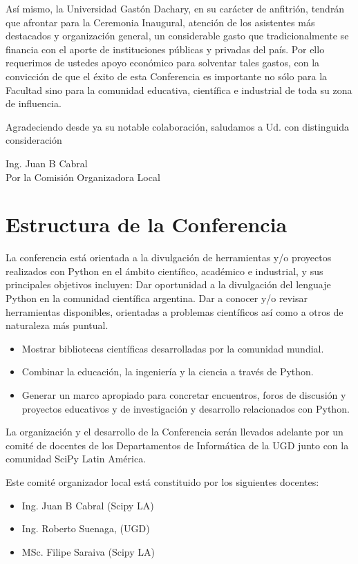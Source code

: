 \documentclass[11pt,a4paper]{report}
\begin{document}
Así mismo, la Universidad Gastón Dachary,  en su carácter de
anfitrión, tendrán que afrontar para la Ceremonia Inaugural, atención
de los asistentes más destacados y organización general, un
considerable gasto que tradicionalmente se financia con el aporte de
instituciones públicas y privadas del país. Por ello requerimos de
ustedes apoyo económico para solventar tales gastos, con la convicción
de que el éxito de esta Conferencia es importante no sólo para la
Facultad sino para la comunidad educativa, científica e industrial de
toda su zona de influencia.

Agradeciendo desde ya su notable colaboración, saludamos a Ud.
con distinguida consideración\\[0.5cm]



\begin{flushright}
Ing. Juan B Cabral\\
Por la Comisión Organizadora Local \\

\end{flushright}
\newpage
\section*{Estructura de la Conferencia}

    La conferencia está orientada a la divulgación de herramientas y/o
    proyectos realizados con Python en el ámbito científico, académico e
    industrial, y sus principales objetivos incluyen: Dar oportunidad a la
    divulgación del lenguaje Python en la comunidad científica argentina.
    Dar a conocer y/o revisar herramientas disponibles, orientadas a problemas
    científicos así como a otros de naturaleza más puntual.
  \begin{itemize}
    \item Mostrar bibliotecas científicas desarrolladas por la comunidad mundial.
    \item Combinar la educación, la ingeniería y la ciencia a través de Python.
    \item Generar un marco apropiado para concretar encuentros, foros de discusión y proyectos educativos y de investigación y desarrollo relacionados con Python.
  \end{itemize}
La organización y el desarrollo de la Conferencia serán llevados adelante
por un comité de docentes de los Departamentos de Informática de la UGD junto
con la comunidad SciPy Latin América.

Este comité organizador local está constituido por los siguientes docentes:\\
\begin{itemize}[nolistsep]
    \item Ing. Juan B Cabral (Scipy LA)
    \item Ing. Roberto Suenaga, (UGD)
    \item MSc. Filipe Saraiva (Scipy LA)
\end{itemize}
\end{document}
